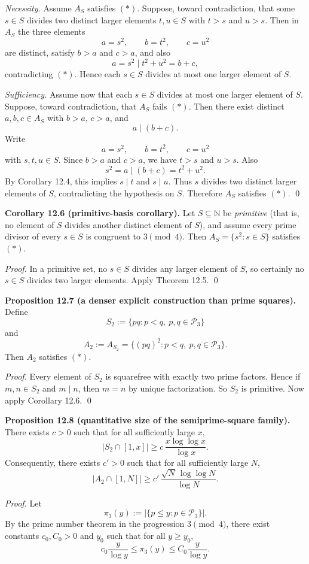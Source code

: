 \emph{Necessity.}
Assume $A_S$ satisfies $(*)$.
Suppose, toward contradiction, that some $s\in S$ divides two distinct larger elements $t,u\in S$ with $t>s$ and $u>s$.
Then in $A_S$ the three elements
\[
a=s^2,\qquad b=t^2,\qquad c=u^2
\]
are distinct, satisfy $b>a$ and $c>a$, and also
\[
a=s^2\mid t^2+u^2=b+c,
\]
contradicting $(*)$.
Hence each $s\in S$ divides at most one larger element of $S$.

\emph{Sufficiency.}
Assume now that each $s\in S$ divides at most one larger element of $S$.
Suppose, toward contradiction, that $A_S$ fails $(*)$.
Then there exist distinct $a,b,c\in A_S$ with $b>a$, $c>a$, and
\[
a\mid (b+c).
\]
Write
\[
a=s^2,\qquad b=t^2,\qquad c=u^2
\]
with $s,t,u\in S$.
Since $b>a$ and $c>a$, we have $t>s$ and $u>s$.
Also
\[
s^2=a\mid (b+c)=t^2+u^2.
\]
By Corollary 12.4, this implies $s\mid t$ and $s\mid u$.
Thus $s$ divides two distinct larger elements of $S$, contradicting the hypothesis on $S$.
Therefore $A_S$ satisfies $(*)$.
\qed

\medskip
\noindent\textbf{Corollary 12.6 (primitive-basis corollary).}
Let $S\subseteq\mathbb N$ be \emph{primitive} (that is, no element of $S$ divides another distinct element of $S$), and assume every prime divisor of every $s\in S$ is congruent to $3\pmod 4$.
Then $A_S=\{s^2:s\in S\}$ satisfies $(*)$.

\emph{Proof.}
In a primitive set, no $s\in S$ divides any larger element of $S$, so certainly no $s\in S$ divides two larger elements.
Apply Theorem 12.5.
\qed

\medskip
\noindent\textbf{Proposition 12.7 (a denser explicit construction than prime squares).}
Define
\[
S_2:=\{pq: p<q,\ p,q\in\mathcal P_3\}
\]
and
\[
A_2:=A_{S_2}=\{(pq)^2: p<q,\ p,q\in\mathcal P_3\}.
\]
Then $A_2$ satisfies $(*)$.

\emph{Proof.}
Every element of $S_2$ is squarefree with exactly two prime factors.
Hence if $m,n\in S_2$ and $m\mid n$, then $m=n$ by unique factorization.
So $S_2$ is primitive.
Now apply Corollary 12.6.
\qed

\medskip
\noindent\textbf{Proposition 12.8 (quantitative size of the semiprime-square family).}
There exists $c>0$ such that for all sufficiently large $x$,
\[
|S_2\cap[1,x]|\ge c\,\frac{x\log\log x}{\log x}.
\]
Consequently, there exists $c'>0$ such that for all sufficiently large $N$,
\[
|A_2\cap[1,N]|\ge c'\,\frac{\sqrt N\,\log\log N}{\log N}.
\]

\emph{Proof.}
Let
\[
\pi_3(y):=|\{p\le y: p\in\mathcal P_3\}|.
\]
By the prime number theorem in the progression $3\pmod 4$, there exist constants $c_0,C_0>0$ and $y_0$ such that for all $y\ge y_0$,
\[
c_0\frac{y}{\log y}\le \pi_3(y)\le C_0\frac{y}{\log y}.
\]

